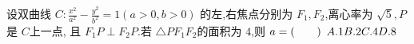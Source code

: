 \documentclass[class=ctexart,crop=false]{standalone}
\begin{document}
设双曲线 $ C:\frac{x^2}{a^2}-\frac{y^2}{b^2}=1 (a>0,b>0)$
的左,右焦点分别为 $F_1,F_2$,离心率为 $\sqrt{5},P$是 $C$上一点,
且 $F_1P \perp F_2P.$若 $\triangle PF_1F_2$的面积为 $4$,则
$a=  \hfill (\qquad)\\$
$A. 1\hfill B. 2\hfill C. 4\hfill D. 8\hfill$
\end{document}
